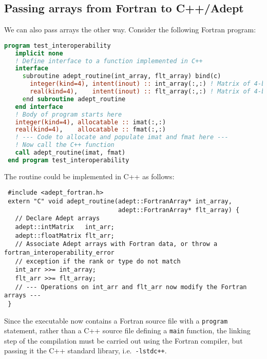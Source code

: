 \documentclass[a4,oneside]{book}
\def\codesize{\small}
\def\code#1{{\codesize\texttt{#1}}}
\begin{document}
\subsection{Passing arrays from Fortran to C++/Adept}
We can also pass arrays the other way. Consider the following Fortran
program:
\begin{lstlisting}[language=Fortran]
 program test_interoperability
   implicit none
   ! Define interface to a function implemented in C++
   interface
     subroutine adept_routine(int_array, flt_array) bind(c)
       integer(kind=4), intent(inout) :: int_array(:,:) ! Matrix of 4-byte integers
       real(kind=4),    intent(inout) :: flt_array(:,:) ! Matrix of 4-byte real numbers
     end subroutine adept_routine 
   end interface
   ! Body of program starts here
   integer(kind=4), allocatable :: imat(:,:)
   real(kind=4),    allocatable :: fmat(:,:)  
   ! --- Code to allocate and populate imat and fmat here ---
   ! Now call the C++ function
   call adept_routine(imat, fmat)
 end program test_interoperability
\end{lstlisting}
The routine could be implemented in C++ as follows:
\begin{lstlisting}
 #include <adept_fortran.h>
 extern "C" void adept_routine(adept::FortranArray* int_array,
                               adept::FortranArray* flt_array) {
   // Declare Adept arrays
   adept::intMatrix   int_arr;
   adept::floatMatrix flt_arr;
   // Associate Adept arrays with Fortran data, or throw a fortran_interoperability_error
   // exception if the rank or type do not match
   int_arr >>= int_array;
   flt_arr >>= flt_array;
   // --- Operations on int_arr and flt_arr now modify the Fortran arrays ---
 }
\end{lstlisting}
Since the executable now contains a Fortran source file with a
\code{program} statement, rather than a C++ source file defining a
\code{main} function, the linking step of the compilation must be
carried out using the Fortran compiler, but passing it the C++
standard library, i.e.\ \code{-lstdc++}.
\end{document}

